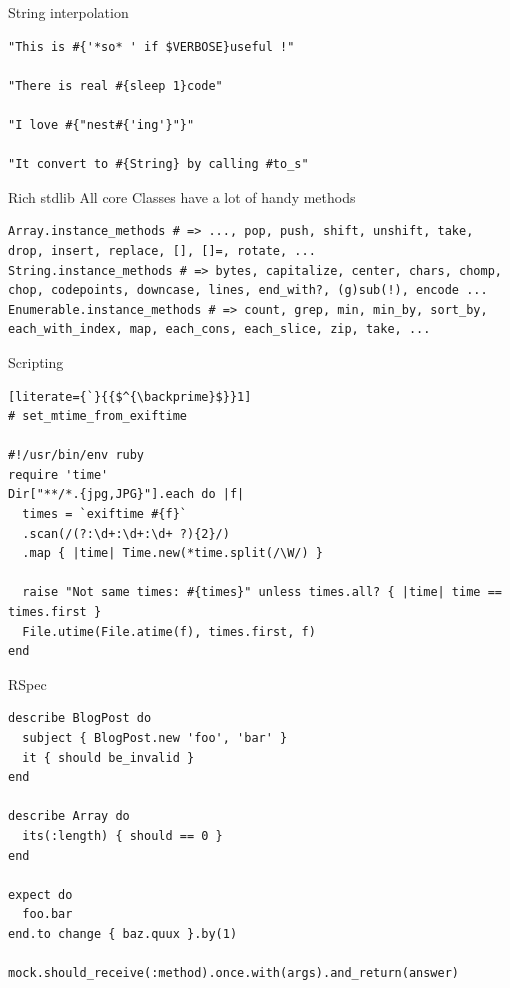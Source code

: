 \documentclass[10pt]{beamer}
\begin{document}
\begin{frame}[fragile]{String interpolation}
\begin{lstlisting}[xleftmargin=20pt]
"This is #{'*so* ' if $VERBOSE}useful !"

"There is real #{sleep 1}code"

"I love #{"nest#{'ing'}"}"

"It convert to #{String} by calling #to_s"
\end{lstlisting}
\end{frame}

\begin{frame}[fragile]{Rich stdlib}
All core Classes have a lot of handy methods
\begin{lstlisting}
Array.instance_methods # => ..., pop, push, shift, unshift, take, drop, insert, replace, [], []=, rotate, ...
String.instance_methods # => bytes, capitalize, center, chars, chomp, chop, codepoints, downcase, lines, end_with?, (g)sub(!), encode ...
Enumerable.instance_methods # => count, grep, min, min_by, sort_by, each_with_index, map, each_cons, each_slice, zip, take, ...
\end{lstlisting}
\end{frame}

\begin{frame}[fragile]{Scripting}
\begin{lstlisting}[literate={`}{{$^{\backprime}$}}1]
# set_mtime_from_exiftime

#!/usr/bin/env ruby
require 'time'
Dir["**/*.{jpg,JPG}"].each do |f|
  times = `exiftime #{f}`
  .scan(/(?:\d+:\d+:\d+ ?){2}/)
  .map { |time| Time.new(*time.split(/\W/) }

  raise "Not same times: #{times}" unless times.all? { |time| time == times.first }
  File.utime(File.atime(f), times.first, f)
end
\end{lstlisting}
\end{frame}

\begin{frame}[fragile]{RSpec}
\begin{lstlisting}
describe BlogPost do
  subject { BlogPost.new 'foo', 'bar' }
  it { should be_invalid }
end

describe Array do
  its(:length) { should == 0 }
end

expect do
  foo.bar
end.to change { baz.quux }.by(1)

mock.should_receive(:method).once.with(args).and_return(answer)
\end{lstlisting}
\end{frame}
\end{document}
